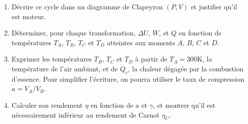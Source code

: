 \begin{enumerate}

	\item Décrire ce cycle dans un diagramme de Clapeyron $(P,V)$ et justifier qu'il est moteur.

	\item Déterminer, pour chaque transformation, $\Delta U$, $W$, et $Q$ en fonction de températures $T_A$, $T_B$, $T_C$ et $T_D$ atteintes aux moments $A$, $B$, $C$ et $D$.
	
	\item Exprimer les températures $T_B$, $T_C$ et $T_D$ à partir de $T_A=300$K, la température de l'air ambiant, et de $Q_c$, la chaleur dégagée par la combustion d'essence. Pour simplifier l'écriture, on pourra utiliser le taux de compression $a=V_A/V_B$.
	
	\item  Calculer son rendement $\eta$ en fonction de $a$ et $\gamma$, et montrer qu'il est nécessairement inférieur au rendement de Carnot $\eta_C$.
	
	
\end{enumerate}

\newpage

